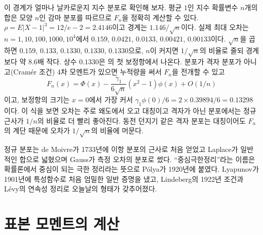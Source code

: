 이 경계가 얼마나 날카로운지 지수 분포로 확인해 보자. 평균 $1$인 지수 확률변수 $n$개의 합은 모양 $n$인 감마 분포를 따르므로 $F_n$을 정확히 계산할 수 있다. $\rho=E|X-1|^3=12/e-2=2.4146$이고 경계는 $1.146/\sqrt n$이다. 실제 최대 오차는 $n=1,10,100,1000,10^4$에서 $0.159$, $0.0421$, $0.0133$, $0.00421$, $0.00133$이다. $\sqrt n$을 곱하면 $0.159$, $0.133$, $0.1330$, $0.1330$, $0.1330$으로, $n$이 커지면 $1/\sqrt n$의 비율로 줄되 경계보다 약 $8.6$배 작다. 상수 $0.1330$은 의 첫 보정항에서 나온다. 분포가 격자 분포가 아니고(Cramér 조건) 4차 모멘트가 있으면 누적량을 써서 $F_n$을 전개할 수 있고
\[
F_n(x)=\Phi(x)-\frac{\gamma_1}{6\sqrt n}(x^2-1)\phi(x)+O(1/n)
\]
이고, 보정항의 크기는 $x=0$에서 가장 커서 $\gamma_1\phi(0)/6=2\times0.39894/6=0.13298$이다. 이 식을 보면 오차는 주로 왜도에서 오고 대칭이고 격자가 아닌 분포에서는 정규 근사가 $1/n$의 비율로 더 빨리 좋아진다. 동전 던지기 같은 격자 분포는 대칭이어도 $F_n$의 계단 때문에 오차가 $1/\sqrt n$의 비율에 머문다.

\begin{aside}
정규 분포는 de Moivre가 1733년에 이항 분포의 근사로 처음 얻었고 Laplace가 일반적인 합으로 넓혔으며 Gauss가 측정 오차의 분포로 썼다. ``중심극한정리''라는 이름은 확률론에서 중심이 되는 극한 정리라는 뜻으로 Pólya가 1920년에 붙였다\cite{polya1920}. Lyapunov가 1901년에 특성함수로 처음 엄밀한 일반 증명을 냈고, Lindeberg의 1922년 조건과 Lévy의 연속성 정리로 오늘날의 형태가 갖추어졌다.
\end{aside}

\section{표본 모멘트의 계산}
\label{sec:sample-moments}

